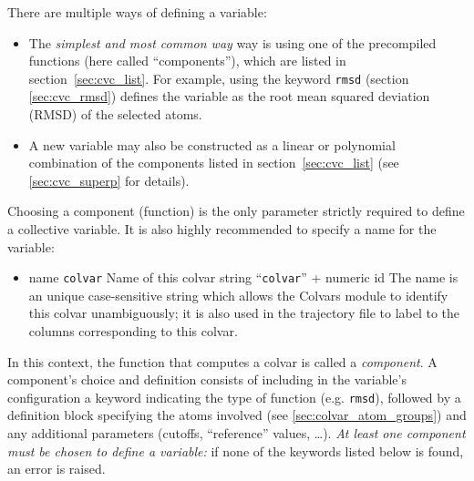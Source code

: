 \noindent{}There are multiple ways of defining a variable:
\begin{itemize}
\item The \emph{simplest and most common way} way is using one of the precompiled functions (here called ``components''), which are listed in section~\ref{sec:cvc_list}.  For example, using the keyword \texttt{rmsd} (section \ref{sec:cvc_rmsd}) defines the variable as the root mean squared deviation (RMSD) of the selected atoms.
\item A new variable may also be constructed as a linear or polynomial combination of the components listed in section~\ref{sec:cvc_list} (see \ref{sec:cvc_superp} for details).
\ifdefined{}\fi
\end{itemize}
Choosing a component (function) is the only parameter strictly required to define a collective variable.
It is also highly recommended to specify a name for the variable:
\begin{itemize}
\label{sec:colvar_general}
\item %
  \keydef
    {name}{%
    \texttt{colvar}}{%
    Name of this colvar}{%
    string}{%
    ``\texttt{colvar}'' + numeric id}{%
    The name is an unique case-sensitive string which allows the
    Colvars module to identify this colvar unambiguously; it is also
    used in the trajectory file to label to the columns corresponding
    to this colvar.}

\end{itemize}



In this context, the function that computes a colvar is called a \emph{component}.
A component's choice and definition consists of including in the variable's configuration a keyword indicating the type of function (e.g.{} \texttt{rmsd}), followed by a definition block specifying the atoms involved (see \ref{sec:colvar_atom_groups}) and any additional parameters (cutoffs, ``reference'' values, \ldots).
\emph{At least one component must be chosen to define a variable:} if none of the keywords listed below is found, an error is raised.


